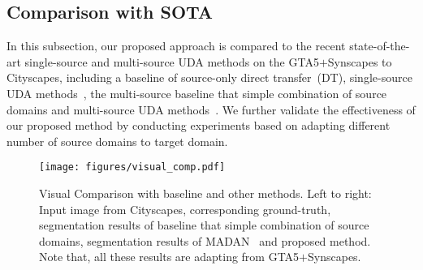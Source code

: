 \documentclass[final]{cvpr}
\begin{document}
\subsection{Comparison with SOTA}

In this subsection, our proposed approach is compared to the recent state-of-the-art single-source and multi-source UDA methods on the GTA5$+$Synscapes to Cityscapes, including a baseline of source-only direct transfer~(DT), single-source UDA methods~\cite{tsai2018learning,pan2020unsupervised,vu2019advent,Lian_2019_ICCV,li2019bidirectional,FDA_Yang_2020_CVPR,lv2020spygr}, the multi-source baseline that simple combination of source domains and multi-source UDA methods~\cite{zhao2018adversarial,zhao2019multi}. We further validate the effectiveness of our proposed method by conducting experiments based on adapting different number of source domains to target domain.

\begin{figure}[t]
	\begin{center}
\texttt{[image: figures/visual\_comp.pdf]}
	\end{center}\vspace{-10pt}
	\caption{Visual Comparison with baseline and other methods. Left to right: Input image from Cityscapes, corresponding ground-truth, segmentation results of baseline that simple combination of source domains, segmentation results of MADAN~\cite{zhao2019multi} and proposed method. Note that, all these results are adapting from GTA5$+$Synscapes.}
	\label{fig:qualitative_comp}
	\vspace{-10pt}
\end{figure}
\end{document}
